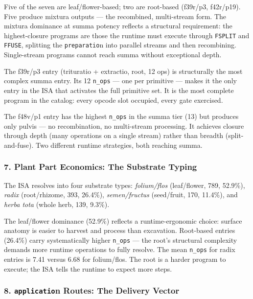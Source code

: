 Five of the seven are leaf/flower-based; two are root-based (f39r/p3,
f42r/p19). Five produce mixtura outputs --- the recombined, multi-stream
form. The mixtura dominance at summa potency reflects a structural
requirement: the highest-closure programs are those the runtime must
execute through \texttt{FSPLIT} and \texttt{FFUSE}, splitting the
\texttt{preparatio}n into parallel streams and then recombining.
Single-stream programs cannot reach summa without exceptional depth.

The f39r/p3 entry (trituratio + extractio, root, 12 ops) is structurally
the most complex summa entry. Its 12 \texttt{n\_ops} --- one per
primitive --- makes it the only entry in the ISA that activates the full
primitive set. It is the most complete program in the catalog: every
opcode slot occupied, every gate exercised.

The f48v/p1 entry has the highest \texttt{n\_ops} in the summa tier (13)
but produces only pulvis --- no recombination, no multi-stream
processing. It achieves closure through depth (many operations on a
single stream) rather than breadth (split-and-fuse). Two different
runtime strategies, both reaching summa.

\hypertarget{plant-part-economics-the-substrate-typing}{%
\subsubsection{7. Plant Part Economics: The Substrate
Typing}\label{plant-part-economics-the-substrate-typing}}

The ISA resolves into four substrate types: \emph{folium/flos}
(leaf/flower, 789, 52.9\%), \emph{radix} (root/rhizome, 393, 26.4\%),
\emph{semen/fructus} (seed/fruit, 170, 11.4\%), and \emph{herba tota}
(whole herb, 139, 9.3\%).

The leaf/flower dominance (52.9\%) reflects a runtime-ergonomic choice:
surface anatomy is easier to harvest and process than excavation.
Root-based entries (26.4\%) carry systematically higher \texttt{n\_ops}
--- the root's structural complexity demands more runtime operations to
fully resolve. The mean \texttt{n\_ops} for radix entries is 7.41 versus
6.68 for folium/flos. The root is a harder program to execute; the ISA
tells the runtime to expect more steps.

\hypertarget{application-routes-the-delivery-vector}{%
\subsubsection{\texorpdfstring{8. \texttt{applicatio}n Routes: The
Delivery
Vector}{8. application Routes: The Delivery Vector}}\label{application-routes-the-delivery-vector}}

